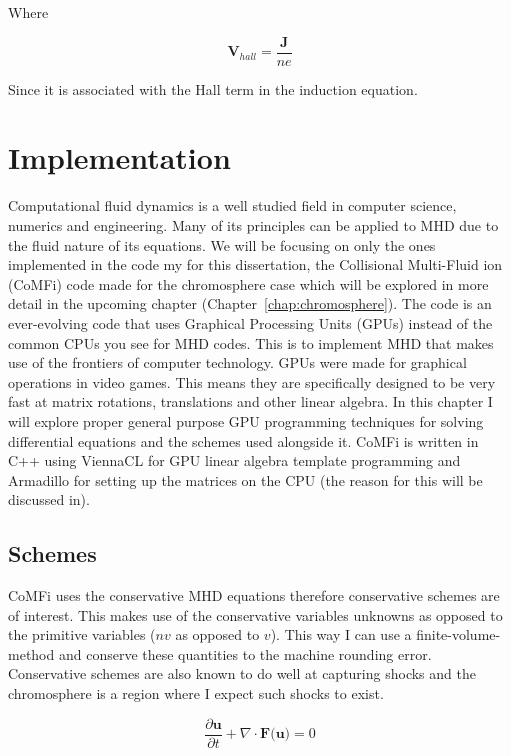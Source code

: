 \documentclass[12pt,upcase]{umlthesis}
\begin{document}
Where

\begin{equation}
	\textbf{V}_{hall} = \frac{\textbf{J}}{ne}
\end{equation}

Since it is associated with the Hall term in the induction equation.

\chapter{Implementation}\label{chap:implementation}

Computational fluid dynamics is a well studied field in computer science, numerics and engineering. Many of its principles can be applied to MHD due to the fluid nature of its equations. We will be focusing on only the ones implemented in the code my for this dissertation, the Collisional Multi-Fluid ion (CoMFi) code made for the chromosphere case which will be explored in more detail in the upcoming chapter (Chapter~\ref{chap:chromosphere}). The code is an ever-evolving code that uses Graphical Processing Units (GPUs) instead of the common CPUs you see for MHD codes. This is to implement MHD that makes use of the frontiers of computer technology. GPUs were made for graphical operations in video games. This means they are specifically designed to be very fast at matrix rotations, translations and other linear algebra. In this chapter I will explore proper general purpose GPU programming techniques for solving differential equations and the schemes used alongside it. CoMFi is written in C++ using ViennaCL for GPU linear algebra template programming and Armadillo for setting up the matrices on the CPU (the reason for this will be discussed in).

\section{Schemes}\label{sec:schemes}

CoMFi uses the conservative MHD equations therefore conservative schemes are of interest. This makes use of the conservative variables unknowns as opposed to the primitive variables ($n v$ as opposed to $v$). This way I can use a finite-volume-method and conserve these quantities to the machine rounding error. Conservative schemes are also known to do well at capturing shocks and the chromosphere is a region where I expect such shocks to exist.

\begin{equation}\label{eq:geneuler}
	\frac{\partial \textbf{u}}{\partial t} + \nabla \cdot \textbf{F(u)} = 0
\end{equation}
\end{document}
